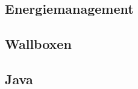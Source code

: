 \begin{spacing}{1}
    \section{Energiemanagement}\label{section:energymanagement}
    \end{spacing}



\begin{spacing}{1}
    \section{Wallboxen}\label{section:wallboxwb}
    \end{spacing}




\begin{spacing}{1}
    \subsection{Java}\label{subsection:javaWallbox}
    \end{spacing}
